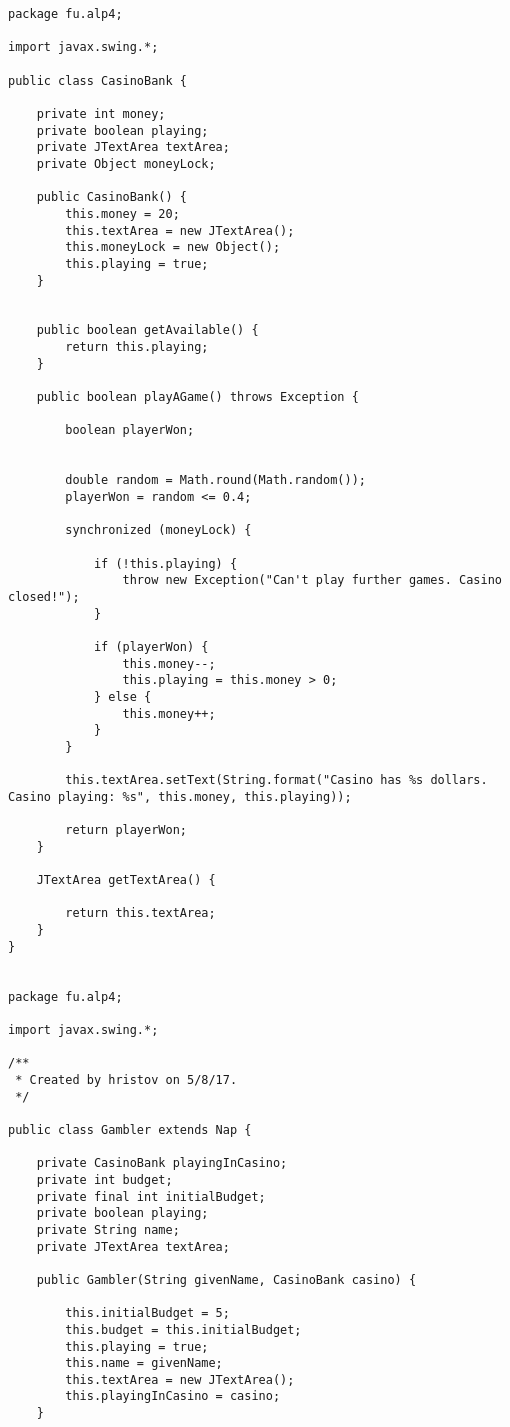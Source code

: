 \begin{lstlisting}[style=java]
package fu.alp4;

import javax.swing.*;

public class CasinoBank {

    private int money;
    private boolean playing;
    private JTextArea textArea;
    private Object moneyLock;

    public CasinoBank() {
        this.money = 20;
        this.textArea = new JTextArea();
        this.moneyLock = new Object();
        this.playing = true;
    }


    public boolean getAvailable() {
        return this.playing;
    }

    public boolean playAGame() throws Exception {

        boolean playerWon;


        double random = Math.round(Math.random());
        playerWon = random <= 0.4;

        synchronized (moneyLock) {

            if (!this.playing) {
                throw new Exception("Can't play further games. Casino closed!");
            }

            if (playerWon) {
                this.money--;
                this.playing = this.money > 0;
            } else {
                this.money++;
            }
        }

        this.textArea.setText(String.format("Casino has %s dollars. Casino playing: %s", this.money, this.playing));

        return playerWon;
    }

    JTextArea getTextArea() {

        return this.textArea;
    }
}


package fu.alp4;

import javax.swing.*;

/**
 * Created by hristov on 5/8/17.
 */

public class Gambler extends Nap {

    private CasinoBank playingInCasino;
    private int budget;
    private final int initialBudget;
    private boolean playing;
    private String name;
    private JTextArea textArea;

    public Gambler(String givenName, CasinoBank casino) {

        this.initialBudget = 5;
        this.budget = this.initialBudget;
        this.playing = true;
        this.name = givenName;
        this.textArea = new JTextArea();
        this.playingInCasino = casino;
    }


\end{lstlisting}
